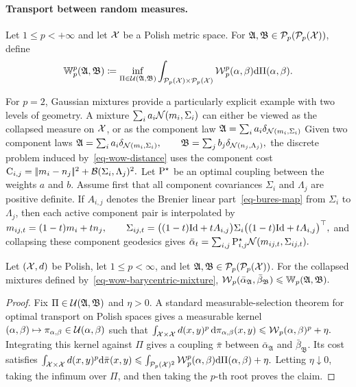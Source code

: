\paragraph{Transport between random measures.}
\begin{defn}\label{def-wasserstein-over-wasserstein}
Let $1\leq p<+\infty$ and let $\X$ be a Polish metric space. For $\mathfrak A,\mathfrak B\in\Pp_p(\Pp_p(\X))$, define
\begin{equation}\label{eq-wow-distance}
\mathbb W_p^p(\mathfrak A,\mathfrak B)
\eqdef
\inf_{\Pi\in\Couplings(\mathfrak A,\mathfrak B)}
\int_{\Pp_p(\X)\times\Pp_p(\X)}
\Wass_p^p(\alpha,\beta)\d\Pi(\alpha,\beta).
\end{equation}
\end{defn}
For $p=2$, Gaussian mixtures provide a particularly explicit example with two levels of geometry. A mixture $\sum_i a_i\Gaussian(m_i,\Sigma_i)$ can either be viewed as the collapsed measure on $\X$, or as the component law
\(\mathfrak A=\sum_i a_i\delta_{\Gaussian(m_i,\Sigma_i)}\)
Given two component laws
\(\mathfrak A=\sum_i a_i\delta_{\Gaussian(m_i,\Sigma_i)}, \qquad \mathfrak B=\sum_j b_j\delta_{\Gaussian(n_j,\Lambda_j)},\)
the discrete problem induced by~\eqref{eq-wow-distance} uses the component cost
\(\C_{i,j}=\norm{m_i-n_j}^2+\Bb(\Sigma_i,\Lambda_j)^2.\)
Let $\P^\star$ be an optimal coupling between the weights $a$ and $b$. Assume first that all component covariances $\Sigma_i$ and $\Lambda_j$ are positive definite. If $A_{i,j}$ denotes the Brenier linear part~\eqref{eq-bures-map} from $\Sigma_i$ to $\Lambda_j$, then each active component pair is interpolated by
\(m_{ij,t}=(1-t)m_i+t n_j, \qquad \Sigma_{ij,t} = \big((1-t)\Id+tA_{i,j}\big)\Sigma_i \big((1-t)\Id+tA_{i,j}\big)^\top,\)
and collapsing these component geodesics gives \(\bar\alpha_t= \sum_{i,j}\P^\star_{i,j}\Gaussian(m_{ij,t},\Sigma_{ij,t}).\)
\begin{prop}\label{prop-wow-collapsed-bound}
Let $(\X,\dist)$ be Polish, let $1\leq p<\infty$, and let $\mathfrak A,\mathfrak B\in\Pp_p(\Pp_p(\X))$. For the collapsed mixtures defined by~\eqref{eq-wow-barycentric-mixture},
\(\Wass_p(\bar\alpha_{\mathfrak A},\bar\beta_{\mathfrak B}) \leq \mathbb W_p(\mathfrak A,\mathfrak B).\)
\end{prop}
\begin{proof}
Fix $\Pi\in\Couplings(\mathfrak A,\mathfrak B)$ and $\eta>0$. A standard measurable-selection theorem for optimal transport on Polish spaces gives a measurable kernel $(\alpha,\beta)\mapsto\pi_{\alpha,\beta}\in\Couplings(\alpha,\beta)$ such that
\(\int_{\X\times\X}\dist(x,y)^p\,\d\pi_{\alpha,\beta}(x,y) \leq \Wass_p(\alpha,\beta)^p+\eta.\)
Integrating this kernel against $\Pi$ gives a coupling $\bar\pi$ between $\bar\alpha_{\mathfrak A}$ and $\bar\beta_{\mathfrak B}$. Its cost satisfies
\(\int_{\X\times\X}\dist(x,y)^p\d\bar\pi(x,y) \leq \int_{\Pp_p(\X)^2}\Wass_p^p(\alpha,\beta)\d\Pi(\alpha,\beta)+\eta.\)
Letting $\eta\downarrow0$, taking the infimum over $\Pi$, and then taking the $p$-th root proves the claim.
\end{proof}
